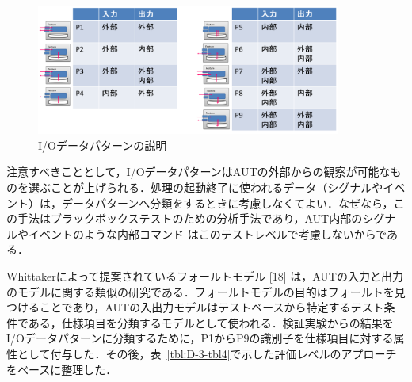 \documentclass[a4paper,11pt]{jreport}
\begin{document}
    \begin{figure}[h]
  \begin{center}
  \includegraphics[width=10cm]{./image/D-3-Fig5.png}
  \caption{I/Oデータパターンの説明}
  \label{fig:D-3-Fig5}
  \end{center}
   \end{figure}

注意すべきこととして，I/OデータパターンはAUTの外部からの観察が可能なものを選ぶことが上げられる．処理の起動終了に使われるデータ（シグナルやイベント）は，データパターンへ分類をするときに考慮しなくてよい．なぜなら，この手法はブラックボックステストのための分析手法であり，AUT内部のシグナルやイベントのような内部コマンド はこのテストレベルで考慮しないからである．

  Whittakerによって提案されているフォールトモデル [18] は，AUTの入力と出力のモデルに関する類似の研究である．フォールトモデルの目的はフォールトを見つけることであり，AUTの入出力モデルはテストベースから特定するテスト条件である，仕様項目を分類するモデルとして使われる．検証実験からの結果をI/Oデータパターンに分類するために，P1からP9の識別子を仕様項目に対する属性として付与した．その後，表~\ref{tbl:D-3-tbl4}で示した評価レベルのアプローチをベースに整理した．
\end{document}
